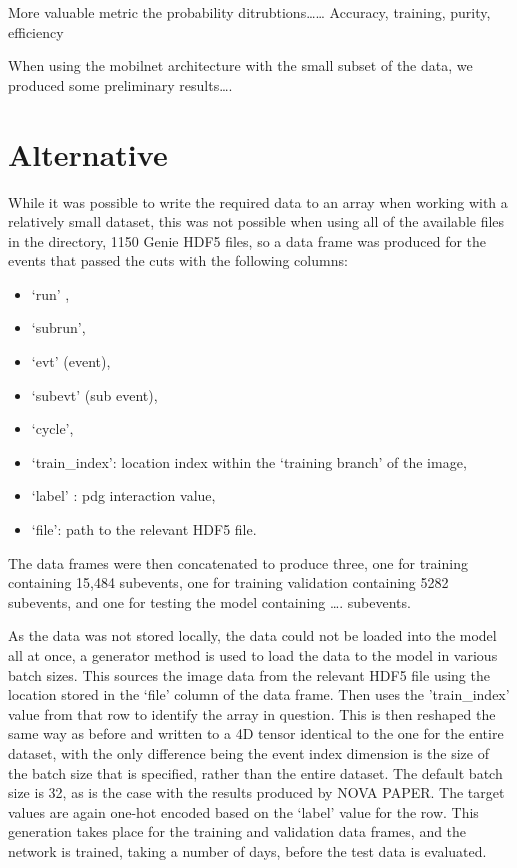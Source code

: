 \documentclass[11pt]{article}
\begin{document}
More valuable metric the probability ditrubtions…… Accuracy, training, purity, efficiency 

When using the mobilnet architecture with the small subset of the data, we produced some preliminary results….


\section*{Alternative}

While it was possible to write the required data to an array when working with a relatively small dataset, this was not possible when using all of the available files in the directory, 1150 Genie HDF5 files, so a data frame was produced for the events that passed the cuts with the following columns:
{\begin{itemize}
 \vspace*{-3mm}
\item ‘run’ ,
 \vspace*{-3mm}
\item ‘subrun’,
 \vspace*{-3mm}
\item ‘evt’ (event),
 \vspace*{-3mm}
\item ‘subevt’ (sub event),
 \vspace*{-3mm}
 \item ‘cycle’,
 \vspace*{-3mm}
\item ‘train\_index’:  location index within the ‘training branch’ of the image,
 \vspace*{-3mm}
\item ‘label’ : pdg interaction value,
 \vspace*{-3mm}
\item ‘file’: path to the relevant HDF5 file. 
 \vspace*{-3mm}
  \end{itemize}}

The data frames were then concatenated to produce three, one for training containing 15,484 subevents, one for training validation containing 5282 subevents, and one for testing the model containing …. subevents. 

As the data was not stored locally, the data could not be loaded into the model all at once, a generator method is used to load the data to the model in various batch sizes. This sources the image data from the relevant HDF5 file using the location stored in the ‘file’ column of the data frame. Then uses the 'train\_index' value from that row to identify the array in question. This is then reshaped the same way as before and written to a 4D tensor identical to the one for the entire dataset, with the only difference being the event index dimension is the size of the batch size that is specified, rather than the entire dataset. The default batch size is 32, as is the case with the results produced by NOVA PAPER. The target values are again one-hot encoded based on the ‘label’ value for the row.
This generation takes place for the training and validation data frames, and the network is trained, taking a number of days, before the test data is evaluated.
\end{document}
